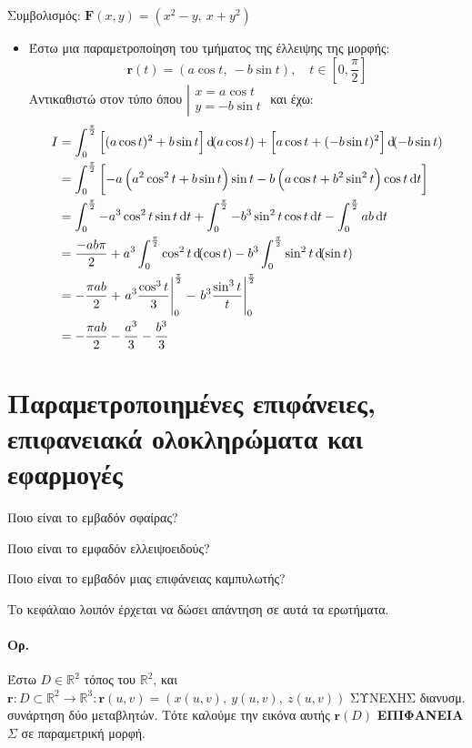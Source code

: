 \documentclass[11pt,a4paper,titlepage,draft]{article}
\begin{document}
\begin{attnbox}{}
Συμβολισμός: \( \mathbf F(x,y) = \left(x^2-y,\ x+y^2\right) \)
\end{attnbox}

\begin{itemize}
\item Έστω μια παραμετροποίηση του τμήματος της έλλειψης της μορφής:
\[
\mathbf r(t) = \left(
a\cos t,\ -b\sin t
\right), \quad t \in \left[0,\frac{\pi}{2}\right]
\]
Αντικαθιστώ στον τύπο όπου \( \left|\begin{array}{l}
x = a\cos t \\ y = -b\sin t
\end{array}\right. \) και έχω:
\begin{align*}
I &= \int_0^\frac{\pi}{2}
\left[
(a\cos t)^2+b\sin t
\right] \dif (a\cos t) + \left[
a\cos t + (-b\sin t)^2
\right] \dif (-b\sin t)
\\ &= \int_0^\frac{\pi}{2} \left[
-a\left(
a^2\cos^2t+b\sin t
\right) \sin t -b \left(
a\cos t + b^2\sin^2 t
\right) \cos t \dif t
\right]
\\ &= \int_0^\frac{\pi}{2} -a^3\cos^2t\sin t\dif t + \int_0^\frac{\pi}{2} -b^3\sin^2t\cos t\dif t - \int_0^\frac{\pi}{2} ab\dif t
\\ &= \frac{-ab\pi}{2} + a^3\int_0^\frac{\pi}{2} \cos^2t\dif(\cos t) - b^3\int_0^\frac{\pi}{2} \sin^2t\dif(\sin t)
\\ &= -\frac{\pi ab}{2}+\left. a^3\frac{\cos^3t}{3} \right|_0^\frac{\pi}{2} -\left. b^3\frac{\sin^3t}{t} \right|_0^\frac{\pi}{2}
\\ &= -\frac{\pi ab}{2} - \frac{a^3}{3} - \frac{b^3}{3}
\end{align*}
\end{itemize}

\section{Παραμετροποιημένες επιφάνειες, επιφανειακά ολοκληρώματα και εφαρμογές}
Ποιο είναι το εμβαδόν σφαίρας?

Ποιο είναι το εμφαδόν ελλειψοειδούς?

Ποιο είναι το εμβαδόν μιας επιφάνειας καμπυλωτής?

Το κεφάλαιο λοιπόν έρχεται να δώσει απάντηση σε αυτά τα ερωτήματα.

\paragraph{Ορ.}
Έστω \( D \in \mathbb R ^2 \) τόπος του \( \mathbb R ^2 \), και \( \mathbf r: D \subset \mathbb R ^2 \to \mathbb R ^3 : \mathbf r(u,v)=\left(
x(u,v),\ y(u,v),\ z(u,v)
\right) \) ΣΥΝΕΧΗΣ διανυσμ. συνάρτηση δύο μεταβλητών. Τότε καλούμε την εικόνα αυτής \( \mathbf r(D) \) \textbf{ΕΠΙΦΑΝΕΙΑ} \( \varSigma \) σε παραμετρική μορφή.
\end{document}
